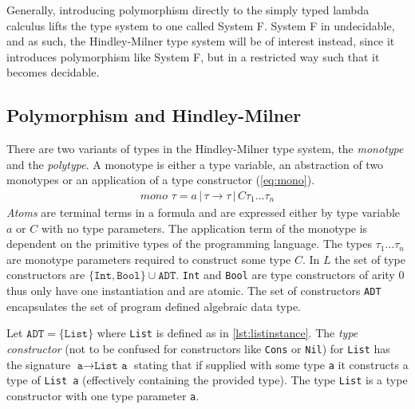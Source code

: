 Generally, introducing polymorphism directly to the simply typed lambda calculus lifts the type system to one called System F.
System F in undecidable, and as such, the Hindley-Milner type system will be of interest instead, since it introduces polymorphism like System F, but in a restricted way such that it becomes decidable.


\subsection{Polymorphism and Hindley-Milner}
There are two variants of types in the Hindley-Milner type system, the \textit{monotype} and the \textit{polytype}.
A monotype is either a type variable, an abstraction of two monotypes or an application of a type constructor (\autoref{eq:mono}).
\begin{align}
	mono \,\,\tau = a \,|\, \tau \rightarrow \tau \,|\, C \tau_1 \dots \tau_n
	\label{eq:mono}
\end{align}
\textit{Atoms} are terminal terms in a formula and are expressed either by type variable $a$ or $C$ with no type parameters.
The application term of the monotype is dependent on the primitive types of the programming language.
The types $\tau_1 \dots \tau_n$ are monotype parameters required to construct some type $C$.
In $L$ the set of type constructors are $\{ \texttt{Int}, \texttt{Bool} \} \cup \texttt{ADT}$.
\texttt{Int} and \texttt{Bool} are type constructors of arity 0 thus only have one instantiation and are atomic.
The set of constructors \texttt{ADT} encapsulates the set of program defined algebraic data type.
\begin{exmp}
    Let $\texttt{ADT} = \{ \texttt{List} \}$ where \texttt{List} is defined as in \autoref{lst:listinstance}.
    The \textit{type constructor} (not to be confused for constructors like \texttt{Cons} or \texttt{Nil}) for \texttt{List} has the signature $\texttt{a} \rightarrow \texttt{List a}$ stating that if supplied with some type \texttt{a} it constructs a type of \texttt{List a} (effectively containing the provided type).
    The type \texttt{List} is a type constructor with one type parameter \texttt{a}.
\end{exmp}

